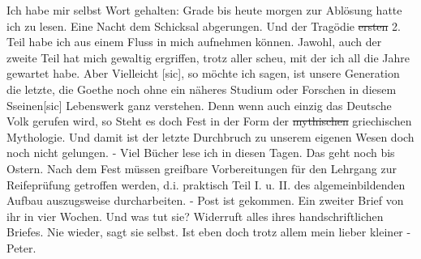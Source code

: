 \def\day{24. April 1943}
\mktitle

Ich habe mir selbst Wort gehalten: Grade bis heute morgen zur Abl\"{o}sung hatte ich zu lesen.
Eine Nacht dem Schicksal abgerungen.
Und der Trag\"{o}die \st{ersten} 2. Teil habe ich aus einem Fluss in mich aufnehmen k\"{o}nnen.
Jawohl, auch der zweite Teil hat mich gewaltig ergriffen, trotz aller scheu, mit der ich all die Jahre gewartet habe.
Aber Vielleicht{\color{red} [sic], so m\"{o}chte ich sagen, ist unsere Generation die letzte, die Goethe noch ohne ein n\"{a}heres Studium oder Forschen in diesem Sseinen[sic] } Lebenswerk ganz verstehen.
Denn wenn auch einzig das Deutsche Volk gerufen wird, so Steht es doch Fest in der Form der \st{mythischen} griechischen Mythologie.
Und damit ist der letzte Durchbruch zu unserem eigenen Wesen doch noch nicht gelungen.
- Viel B\"{u}cher lese ich in diesen Tagen.
Das geht noch bis Ostern.
Nach dem Fest m\"{u}ssen greifbare Vorbereitungen f\"{u}r den Lehrgang zur Reifepr\"{u}fung getroffen werden, d.i. praktisch Teil I. u. II. des algemeinbildenden Aufbau auszugsweise durcharbeiten.
- Post ist gekommen.
Ein zweiter Brief von ihr in vier Wochen.
Und was tut sie?
Widerruft alles ihres handschriftlichen Briefes.
Nie wieder, sagt sie selbst.
Ist eben doch trotz allem mein lieber kleiner - Peter.

\clearpage

